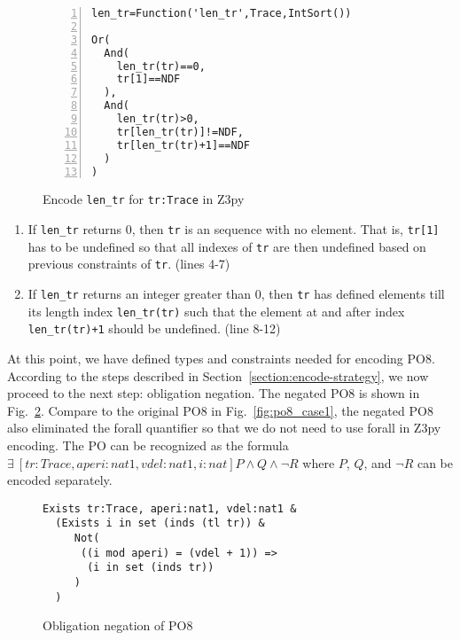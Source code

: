 \begin{figure}[t]
\begin{center}
\begin{mdframed}[roundcorner=5pt,shadow=true]
\begin{Verbatim}[fontsize=\small,numbers=left]
len_tr=Function('len_tr',Trace,IntSort())

Or(
  And(
    len_tr(tr)==0,
    tr[1]==NDF
  ),
  And(
    len_tr(tr)>0,
    tr[len_tr(tr)]!=NDF,
    tr[len_tr(tr)+1]==NDF
  )
)
\end{Verbatim}
\end{mdframed}
\vspace{-10pt}
\caption{Encode {\tt len\_tr} for {\tt tr:Trace} in Z3py}
\label{fig:tr_len_case1}
\end{center}
\end{figure}

\begin{enumerate}
\item
If {\tt len\_tr} returns 0, then {\tt tr} is an sequence with no element. That is, {\tt tr[1]} has to be undefined so that all indexes of {\tt tr} are then undefined based on previous constraints of {\tt tr}. (lines 4-7)
\item
If {\tt len\_tr} returns an integer greater than 0, then {\tt tr} has defined elements till its length index {\tt len\_tr(tr)} such that the element at and after index {\tt len\_tr(tr)+1} should be undefined. (line 8-12)
\end{enumerate}

At this point, we have defined types and constraints needed for encoding PO8. According to the steps described in Section~\ref{section:encode-strategy}, we now proceed to the next step: obligation negation. The negated PO8 is shown in Fig.~\ref{fig:po8_negation_case1}. Compare to the original PO8 in Fig.~\ref{fig:po8_case1}, the negated PO8 also eliminated the forall quantifier so that we do not need to use forall in Z3py encoding. The PO can be recognized as the formula $\exists~[tr:Trace,aperi:nat1,vdel:nat1,i:nat] P \land Q \land \neg R$ where $P$, $Q$, and $\neg R$ can be encoded separately.

\begin{figure}[t]
\begin{center}
\begin{mdframed}[roundcorner=5pt]
\begin{Verbatim}[fontsize=\small]
Exists tr:Trace, aperi:nat1, vdel:nat1 &
  (Exists i in set (inds (tl tr)) &
     Not(
      ((i mod aperi) = (vdel + 1)) =>
       (i in set (inds tr))
     )
  )
\end{Verbatim}
\end{mdframed}
\vspace{-10pt}
\caption{Obligation negation of PO8}
\label{fig:po8_negation_case1}
\end{center}
\end{figure}


